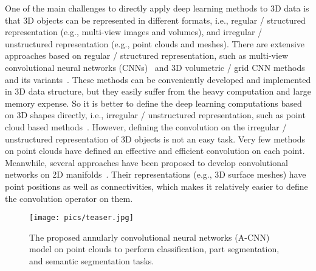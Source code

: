 \documentclass[10pt,twocolumn,letterpaper]{article}
\begin{document}
One of the main challenges to directly apply deep learning methods to 3D data is that 3D objects can be represented in different formats, i.e., regular / structured representation (e.g., multi-view images and volumes), and irregular / unstructured representation (e.g., point clouds and meshes). There are extensive approaches based on regular / structured representation, such as multi-view convolutional neural networks (CNNs)~\cite{su2015multi,qi2016volumetric,huang2018learning} and 3D volumetric / grid CNN methods and its variants~\cite{wu20153d,qi2016volumetric,riegler2017octnet,wang2017cnn,Wang-2018-AOCNN,le2018pointgrid,hua2018pointwise}. These methods can be conveniently developed and implemented in 3D data structure, but they easily suffer from the heavy computation and large memory expense. So it is better to define the deep learning computations based on 3D shapes directly, i.e., irregular / unstructured representation, such as point cloud based methods~\cite{qi2017pointnet,qi2017pointnet++,klokov2017escape,shen2018mining,atzmon2018point,li2018pointcnn,liu2018point2sequence,tatarchenko2018tangent,li2018so,yi2017syncspeccnn,Wang_2018_ECCV,engelmann2017exploring,Ye_2018_ECCV}. 
However, defining the convolution on the irregular / unstructured representation of 3D objects is not an easy task. Very few methods on point clouds have defined an effective and efficient convolution on each point. Meanwhile, several approaches have been proposed to develop convolutional networks on 2D manifolds~\cite{masci2015geodesic,boscaini2016learning,monti2017geometric,Xu_2017_ICCV}. Their representations (e.g., 3D surface meshes) have point positions as well as connectivities, which makes it relatively easier to define the convolution operator on them.
\begin{figure}[t]	
\begin{center}
  \vspace{-0mm}
  \texttt{[image: pics/teaser.jpg]}
  \vspace{-5.5mm}
\end{center}
   \caption{The proposed annularly convolutional neural networks (A-CNN) model on point clouds to perform classification, part segmentation, and semantic segmentation tasks.}\vspace{-5mm}
\label{fig:intro}
\end{figure}
\end{document}
